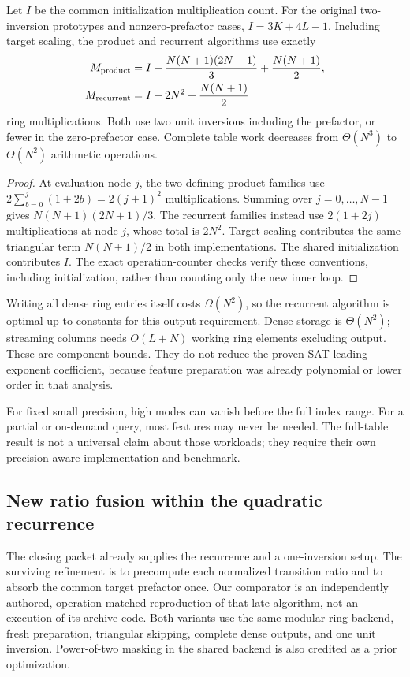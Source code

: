 \documentclass[11pt,letterpaper]{article}
\theoremstyle{remark}\newtheorem{remark}[theorem]{Remark}
\begin{document}
\begin{proposition}\label{prop:cauchy}
Let $I$ be the common initialization multiplication count. For the original two-inversion prototypes and nonzero-prefactor cases, $I=3K+4L-1$. Including target scaling, the product and recurrent algorithms use exactly
\begin{align*}
 M_{\rm product}&=I+\frac{N(N+1)(2N+1)}3+\frac{N(N+1)}2,\\
 M_{\rm recurrent}&=I+2N^2+\frac{N(N+1)}2
\end{align*}
ring multiplications. Both use two unit inversions including the prefactor, or fewer in the zero-prefactor case. Complete table work decreases from $\Theta(N^3)$ to $\Theta(N^2)$ arithmetic operations.
\end{proposition}
\begin{proof}
At evaluation node $j$, the two defining-product families use $2\sum_{b=0}^{j}(1+2b)=2(j+1)^2$ multiplications. Summing over $j=0,\ldots,N-1$ gives $N(N+1)(2N+1)/3$. The recurrent families instead use $2(1+2j)$ multiplications at node $j$, whose total is $2N^2$. Target scaling contributes the same triangular term $N(N+1)/2$ in both implementations. The shared initialization contributes $I$. The exact operation-counter checks verify these conventions, including initialization, rather than counting only the new inner loop.
\end{proof}
Writing all dense ring entries itself costs $\Omega(N^2)$, so the recurrent algorithm is optimal up to constants for this output requirement. Dense storage is $\Theta(N^2)$; streaming columns needs $O(L+N)$ working ring elements excluding output. These are component bounds. They do not reduce the proven SAT leading exponent coefficient, because feature preparation was already polynomial or lower order in that analysis.

For fixed small precision, high modes can vanish before the full index range. For a partial or on-demand query, most features may never be needed. The full-table result is not a universal claim about those workloads; they require their own precision-aware implementation and benchmark.

\subsection{New ratio fusion within the quadratic recurrence}
\label{sec:fusion}
The closing packet already supplies the recurrence and a one-inversion setup.
The surviving refinement is to precompute each normalized transition ratio and
to absorb the common target prefactor once. Our comparator is an independently
authored, operation-matched reproduction of that late algorithm, not an execution
of its archive code. Both variants use the same modular ring backend, fresh
preparation, triangular skipping, complete dense outputs, and one unit inversion.
Power-of-two masking in the shared backend is also credited as a prior optimization.
\end{document}
